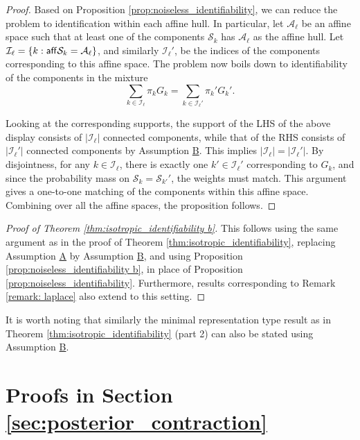 \documentclass[bj,authoryear]{imsart}
\theoremstyle{plain}
\theoremstyle{remark}
\def\aff{{\sf aff}}
\def\cA{\mathcal{A}}
\def\cI{\mathcal{I}}
\def\cS{\mathcal{S}}
\begin{document}
\begin{appendix}
\begin{proof}
Based on Proposition \ref{prop:noiseless_identifiability}, we can reduce the problem to identification within each affine hull. In particular, let $\cA_\ell$ be an affine space such that at least one of the components $\cS_k$ has $\cA_\ell$ as the affine hull. Let $\cI_\ell=\{k:\aff\cS_k = \cA_\ell\}$, and similarly $\cI_\ell'$, be the indices of the components corresponding to this affine space. The problem now boils down to identifiability of the components in the mixture
$$\sum_{k\in \cI_\ell} \pi_k G_k = \sum_{k\in \cI_\ell'} \pi_k' G_k'.$$

Looking at the corresponding supports, the support of the LHS of the above display consists of $|\cI_\ell|$ connected components, while that of the RHS consists of $|\cI_\ell'|$ connected components by Assumption \hyperref[assume:B]{B}. This implies $|\cI_\ell|=|\cI_\ell'|$. By disjointness, for any $k\in\cI_\ell$, there is exactly one $k'\in\cI_\ell'$ corresponding to $G_k$, and since the probability mass on $\cS_k=\cS_{k'}'$, the weights must match. This argument gives a one-to-one matching of the components within this affine space. Combining over all the affine spaces, the proposition follows.
\end{proof}

\begin{proof}[Proof of Theorem \ref{thm:isotropic_identifiability b}]
This follows using the same argument as in the proof of Theorem \ref{thm:isotropic_identifiability}, replacing Assumption \hyperref[assume:A]{A} by Assumption \hyperref[assume:B]{B}, and using Proposition \ref{prop:noiseless_identifiability b}, in place of Proposition \ref{prop:noiseless_identifiability}. Furthermore, results corresponding to Remark \ref{remark: laplace} also extend to this setting.
\end{proof}

It is worth noting that similarly the minimal representation type result as in Theorem \ref{thm:isotropic_identifiability} (part 2) can also be stated using Assumption \hyperref[assume:B]{B}.

\section{Proofs in Section \ref{sec:posterior_contraction}}


\end{appendix}
\end{document}
